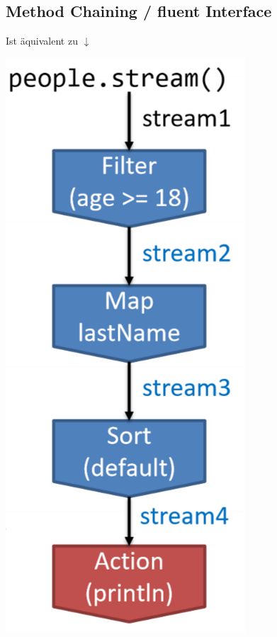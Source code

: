 	\subsection*{Method Chaining / fluent Interface}
		\begin{minipage}{15cm}
			
			\centering Ist äquivalent zu $\downarrow$
			
		\end{minipage}
		\hspace*{0.5cm}
		\begin{minipage}{3.3cm}
			\includegraphics[width=0.8\columnwidth, right]{pics/StreamAPI.png}
		\end{minipage}
